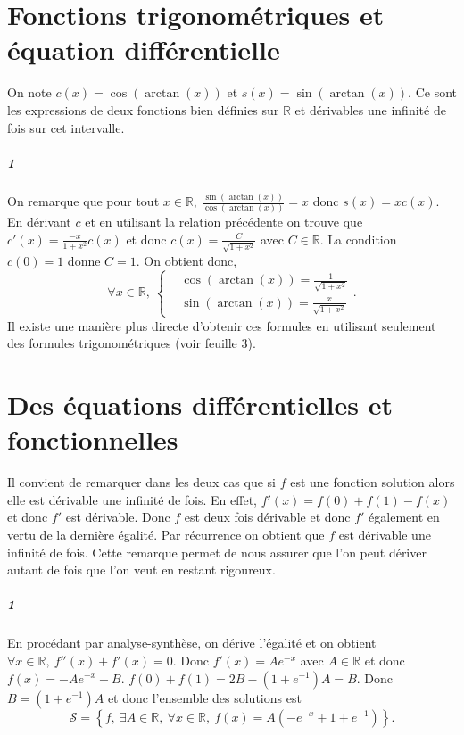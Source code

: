 \documentclass[10pt,a4paper]{article}
\begin{document}
\section{Fonctions trigonométriques et équation différentielle}
On note $c(x) = \cos(\arctan(x))$ et $s(x) = \sin(\arctan(x))$. Ce sont les expressions de deux fonctions bien définies sur $\mathbb{R}$ et dérivables une infinité de fois sur cet intervalle.
\subparagraph{1} On remarque que pour tout $x \in \mathbb{R}, \ \frac{\sin(\arctan(x))}{\cos(\arctan(x))} = x$ donc $s(x) = x c(x)$. En dérivant $c$ et en utilisant la relation précédente on trouve que $c'(x) = \frac{-x}{1+x^2}c(x)$ et donc $c(x) = \frac{C}{\sqrt{1+x^2}}$ avec $C \in \mathbb{R}$. La condition $c(0) = 1$ donne $C = 1$. On obtient donc,
\begin{equation*}
\forall x \in \mathbb{R}, \ 
\left\lbrace
\begin{aligned}
&\cos(\arctan(x)) = \frac{1}{\sqrt{1+x^2}} \\
&\sin(\arctan(x)) = \frac{x}{\sqrt{1+x^2}}
\end{aligned}
\right. .
\end{equation*}
Il existe une manière plus directe d'obtenir ces formules en utilisant seulement des formules trigonométriques (voir feuille 3).

\section{Des équations différentielles et fonctionnelles}
Il convient de remarquer dans les deux cas que si $f$ est une fonction solution alors elle est dérivable une infinité de fois. En effet, $f'(x) = f(0) + f(1) - f(x)$ et donc $f'$ est dérivable. Donc $f$ est deux fois dérivable et donc $f'$ également en vertu de la dernière égalité. Par récurrence on obtient que $f$ est dérivable une infinité de fois. Cette remarque permet de nous assurer que l'on peut dériver autant de fois que l'on veut en restant rigoureux.

\subparagraph{1}En procédant par analyse-synthèse, on dérive l'égalité et on obtient $\forall x \in \mathbb{R}, \ f''(x) + f'(x) = 0$. Donc $f'(x) = Ae^{-x}$ avec $A \in \mathbb{R}$ et donc $f(x) = -Ae^{-x} + B$. $f(0)+f(1) = 2B - (1+e^{-1})A = B$. Donc $B = (1+e^{-1})A$ et donc l'ensemble des solutions est
\begin{equation*}
\mathcal{S} = \left\lbrace f, \ \exists A \in \mathbb{R}, \ \forall x \in \mathbb{R}, \ f(x) = A \left( -e^{-x} + 1 +e^{-1} \right) \right\rbrace .
\end{equation*}
\end{document}
